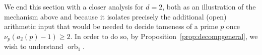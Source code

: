 \documentclass{article}
\theoremstyle{plain}
\theoremstyle{definition}
\theoremstyle{remark}
\newtheorem{remark}[theorem]{Remark}
\newcommand{\Z}{\mathbb{Z}}
\newcommand{\F}{\mathbb{F}}
\DeclareMathOperator{\Ind}{Ind}
\DeclareMathOperator{\Tame}{Tame}
\DeclareMathOperator{\orb}{orb}
\begin{document}



We end this section with a closer analysis for $d=2$, both as an illustration of the mechanism above and because it isolates precisely the additional (open) arithmetic input that would be needed to decide tameness of a prime $p$ once $\nu_p(a_2(p)-1)\ge2$. In order to do so, by Proposition~\ref{prop:decompgeneral}, we wish to understand $\orb_1$. 
\end{document}
